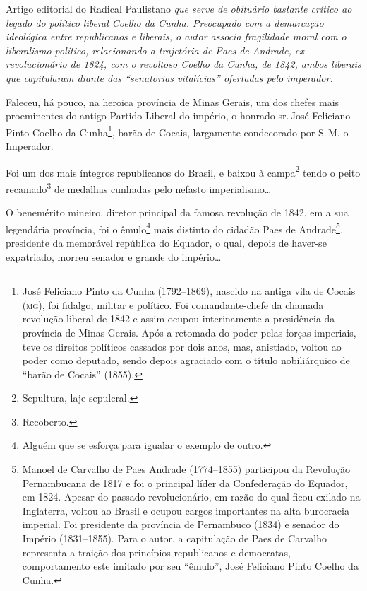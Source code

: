 \begin{didascalia}
Artigo editorial do Radical Paulistano \emph{que serve de obituário
bastante crítico ao legado do político liberal Coelho da Cunha.
Preocupado com a demarcação ideológica entre republicanos e liberais, o
autor associa fragilidade moral com o liberalismo político, relacionando
a trajetória de Paes de Andrade, ex-revolucionário de 1824, com o
revoltoso Coelho da Cunha, de 1842, ambos liberais que capitularam
diante das ``senatorias vitalícias'' ofertadas pelo imperador.}
\end{didascalia}



Faleceu, há pouco, na heroica província de Minas Gerais, um dos chefes
mais proeminentes do antigo Partido Liberal do império, o honrado sr.\,José Feliciano Pinto Coelho da Cunha\footnote{José Feliciano Pinto da
  Cunha (1792--1869), nascido na antiga vila de Cocais (\textsc{mg}), foi fidalgo,
  militar e político. Foi comandante-chefe da chamada revolução liberal
  de 1842 e assim ocupou interinamente a presidência da província de
  Minas Gerais. Após a retomada do poder pelas forças imperiais, teve os
  direitos políticos cassados por dois anos, mas, anistiado, voltou ao
  poder como deputado, sendo depois agraciado com o título nobiliárquico
  de ``barão de Cocais'' (1855).}, barão de Cocais, largamente condecorado
por S.\,M. o Imperador.

Foi um dos mais íntegros republicanos do Brasil, e baixou à
campa\footnote{Sepultura, laje sepulcral.} tendo o peito
recamado\footnote{Recoberto.} de medalhas cunhadas pelo nefasto
imperialismo\ldots{}

O benemérito mineiro, diretor principal da famosa revolução de 1842, em
a sua legendária província, foi o êmulo\footnote{Alguém que se esforça
  para igualar o exemplo de outro.} mais distinto do cidadão Paes de
Andrade\footnote{Manoel de Carvalho de Paes Andrade (1774--1855)
  participou da Revolução Pernambucana de 1817 e foi o principal líder
  da Confederação do Equador, em 1824. Apesar do passado revolucionário,
  em razão do qual ficou exilado na Inglaterra, voltou ao Brasil e
  ocupou cargos importantes na alta burocracia imperial. Foi presidente
  da província de Pernambuco (1834) e senador do Império (1831--1855).
  Para o autor, a capitulação de Paes de Carvalho representa a traição
  dos princípios republicanos e democratas, comportamento este imitado
  por seu ``êmulo'', José Feliciano Pinto Coelho da Cunha.}, presidente da
memorável república do Equador, o qual, depois de haver-se expatriado,
morreu senador e grande do império\ldots{}

